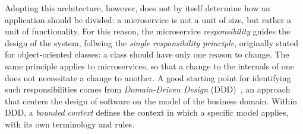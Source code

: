 Adopting this architecture, however, does not by itself determine how an
application should be divided: a microservice is not a unit of size, but rather
a unit of functionality. For this reason, the microservice
\textit{responsibility} guides the design of the system, follwing the
\textit{single responsibility principle}, originally stated for object-oriented
classes: a class should have only one reason to change. The same principle
applies to microservices, so that a change to the internals of one does not 
necessitate a change to another. A good starting point for identifying such
responsibilities comes from \textit{Domain-Driven Design}
(DDD)~\cite{evans2004domain}, an approach that centers the design of software on
the model of the business domain. Within DDD, a \textit{bounded context} defines
the context in which a specific model applies, with its own terminology and rules. 

